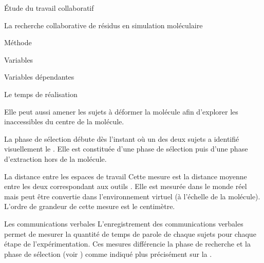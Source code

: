 \documentclass[myfrancais]{mythesis}
\begin{document}
\begin{mypart}{Étude du travail collaboratif}
\begin{mychapter}{La recherche collaborative de résidus en simulation moléculaire}
\begin{mysection}{Méthode}
\begin{mysubsection}{Variables}
\begin{mysubsubsection}{Variables dépendantes}
\begin{myparagraph}{ Le temps de réalisation}
\begin{description}
									Elle peut aussi amener les sujets à déformer la molécule afin d'explorer les  inaccessibles du centre de la molécule.
								\item[La sélection] La phase de sélection débute dès l'instant où un des deux sujets a identifié visuellement le .
									Elle est constituée d'une phase de sélection puis d'une phase d'extraction hors de la molécule.
							\end{description}
						\end{myparagraph}
						\begin{myparagraph}{ La distance entre les espaces de travail}
							Cette mesure est la distance moyenne entre les deux  correspondant aux outils .
							Elle est mesurée dans le monde réel mais peut être convertie dans l'environnement virtuel (à l'échelle de la molécule).
							L'ordre de grandeur de cette mesure est le centimètre.
						\end{myparagraph}
						\begin{myparagraph}{ Les communications verbales}
							L'enregistrement des communications verbales permet de mesurer la quantité de temps de parole de chaque sujets pour chaque étape de l'expérimentation.
							Ces mesures différencie la phase de recherche et la phase de sélection (voir ) comme indiqué plus précisément sur la .


\end{myparagraph}
\end{mysubsubsection}
\end{mysubsection}
\end{mysection}
\end{mychapter}
\end{mypart}
\end{document}
